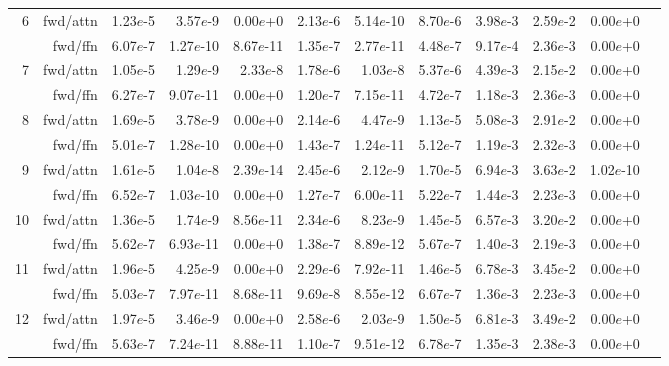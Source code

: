 \begin{table*}[t]
\begin{center}
\begin{tiny}
\begin{sc}
\begin{tabular}{rrrrrrrrrrrr}
\midrule
\multirow{2}{*}{6}       & fwd/attn         & 1.23$e$-5 & 3.57$e$-9  & 0.00$e$+0  & 2.13$e$-6 & 5.14$e$-10 & 8.70$e$-6 & 3.98$e$-3 & 2.59$e$-2 & 0.00$e$+0  \\
        & fwd/ffn          & 6.07$e$-7 & 1.27$e$-10 & 8.67$e$-11 & 1.35$e$-7 & 2.77$e$-11 & 4.48$e$-7 & 9.17$e$-4 & 2.36$e$-3 & 0.00$e$+0  \\
\midrule
 \multirow{2}{*}{7}        & fwd/attn         & 1.05$e$-5 & 1.29$e$-9  & 2.33$e$-8  & 1.78$e$-6 & 1.03$e$-8  & 5.37$e$-6 & 4.39$e$-3 & 2.15$e$-2 & 0.00$e$+0  \\
        & fwd/ffn          & 6.27$e$-7 & 9.07$e$-11 & 0.00$e$+0  & 1.20$e$-7 & 7.15$e$-11 & 4.72$e$-7 & 1.18$e$-3 & 2.36$e$-3 & 0.00$e$+0  \\
\hline
\multirow{2}{*}{8}        & fwd/attn         & 1.69$e$-5 & 3.78$e$-9  & 0.00$e$+0  & 2.14$e$-6 & 4.47$e$-9  & 1.13$e$-5 & 5.08$e$-3 & 2.91$e$-2 & 0.00$e$+0  \\
        & fwd/ffn          & 5.01$e$-7 & 1.28$e$-10 & 0.00$e$+0  & 1.43$e$-7 & 1.24$e$-11 & 5.12$e$-7 & 1.19$e$-3 & 2.32$e$-3 & 0.00$e$+0  \\
\midrule
\multirow{2}{*}{9}       & fwd/attn         & 1.61$e$-5 & 1.04$e$-8  & 2.39$e$-14 & 2.45$e$-6 & 2.12$e$-9  & 1.70$e$-5 & 6.94$e$-3 & 3.63$e$-2 & 1.02$e$-10 \\
        & fwd/ffn          & 6.52$e$-7 & 1.03$e$-10 & 0.00$e$+0  & 1.27$e$-7 & 6.00$e$-11 & 5.22$e$-7 & 1.44$e$-3 & 2.23$e$-3 & 0.00$e$+0  \\
\midrule
\multirow{2}{*}{10}        & fwd/attn         & 1.36$e$-5 & 1.74$e$-9  & 8.56$e$-11 & 2.34$e$-6 & 8.23$e$-9  & 1.45$e$-5 & 6.57$e$-3 & 3.20$e$-2 & 0.00$e$+0  \\
        & fwd/ffn          & 5.62$e$-7 & 6.93$e$-11 & 0.00$e$+0  & 1.38$e$-7 & 8.89$e$-12 & 5.67$e$-7 & 1.40$e$-3 & 2.19$e$-3 & 0.00$e$+0  \\
\midrule
\multirow{2}{*}{11}      & fwd/attn         & 1.96$e$-5 & 4.25$e$-9  & 0.00$e$+0  & 2.29$e$-6 & 7.92$e$-11 & 1.46$e$-5 & 6.78$e$-3 & 3.45$e$-2 & 0.00$e$+0  \\
        & fwd/ffn          & 5.03$e$-7 & 7.97$e$-11 & 8.68$e$-11 & 9.69$e$-8 & 8.55$e$-12 & 6.67$e$-7 & 1.36$e$-3 & 2.23$e$-3 & 0.00$e$+0  \\
\midrule
\multirow{2}{*}{12}      & fwd/attn         & 1.97$e$-5 & 3.46$e$-9  & 0.00$e$+0  & 2.58$e$-6 & 2.03$e$-9  & 1.50$e$-5 & 6.81$e$-3 & 3.49$e$-2 & 0.00$e$+0  \\
        & fwd/ffn          & 5.63$e$-7 & 7.24$e$-11 & 8.88$e$-11 & 1.10$e$-7 & 9.51$e$-12 & 6.78$e$-7 & 1.35$e$-3 & 2.38$e$-3 & 0.00$e$+0  \\

\end{tabular}
\end{sc}
\end{tiny}
\end{center}
\end{table*}
